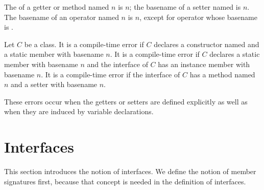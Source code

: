 \documentclass[makeidx]{article}
\begin{document}
\LMHash{}%
The  of a getter or method named $n$ is $n$;
the basename of a setter named  is $n$.
The basename of an operator named $n$ is $n$,
except for operator \code{[]=} whose basename is \code{[]}.

\LMHash{}%
Let $C$ be a class.
It is a compile-time error if $C$
declares a constructor named  and
a static member with basename $n$.
It is a compile-time error if $C$
declares a static member with basename $n$ and
the interface of $C$ has an instance member with basename $n$.
It is a compile-time error if the interface of $C$
has a method named $n$ and a setter with basename $n$.

\LMHash{}%
These errors occur when the getters or setters are defined explicitly
as well as when they are induced by variable declarations.



\section{Interfaces}

\LMHash{}%
This section introduces the notion of interfaces.
We define the notion of member signatures first,
because that concept is needed in the definition of interfaces.

\end{document}
